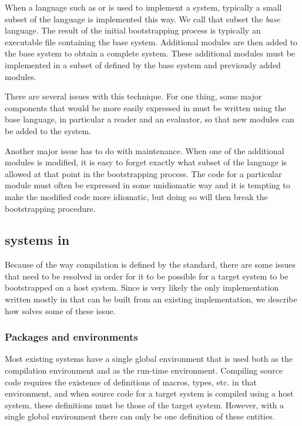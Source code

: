 When a language such as \clanguage{} or \cplusplus{} is used to
implement a \commonlisp{} system, typically a small subset of the
\commonlisp{} language is implemented this way.  We call that subset
the \emph{base} language.  The result of the initial bootstrapping
process is typically an executable file containing the base system.
Additional modules are then added to the base system to obtain a
complete \commonlisp{} system.  These additional modules must be
implemented in a subset of \commonlisp{} defined by the base system
and previously added modules.

There are several issues with this technique.  For one thing, some
major components that would be more easily expressed in \commonlisp{}
must be written using the base language, in particular a reader and an
evaluator, so that new modules can be added to the system.

Another major issue has to do with maintenance.  When one of the
additional modules is modified, it is easy to forget exactly what
subset of the \commonlisp{} language is allowed at that point in the
bootstrapping process.  The code for a particular module must often be
expressed in some unidiomatic way and it is tempting to make the
modified code more idiomatic, but doing so will then break the
bootstrapping procedure.

\subsection{\commonlisp{} systems in \commonlisp{}}

Because of the way compilation is defined by the \commonlisp{}
standard, there are some issues that need to be resolved in order for
it to be possible for a target \commonlisp{} system to be bootstrapped
on a host \commonlisp{} system.  Since \sbcl{} is very likely the only
\commonlisp{} implementation written mostly in \commonlisp{} that can
be built from an existing \commonlisp{} implementation, we describe
how \sbcl{} solves some of these issue.

\subsubsection{Packages and environments}

Most existing \commonlisp{} systems have a single global environment
that is used both as the compilation environment and as the run-time
environment.  Compiling \commonlisp{} source code requires the
existence of definitions of macros, types, etc. in that environment,
and when source code for a target \commonlisp{} system is compiled
using a host \commonlisp{} system, these definitions must be those of
the target system.  However, with a single global environment there
can only be one definition of these entities.

